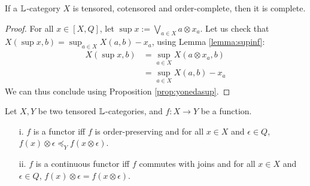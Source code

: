 \begin{proposition}\label{prop:tencoten}
If a $\mathbb{L}$-category $X$ is tensored, cotensored and order-complete, then it is complete.
\end{proposition}
\begin{proof}
For all $x\in [X,Q]$, let $\sup x:= \bigvee_{a\in X}a\otimes x_{a}$. 
Let us check that $X(\sup x, b)= \sup_{a\in X}X(a,b)-x_{a}$, using Lemma \ref{lemma:supinf}:
\begin{align*}
X(\sup x, b) &= \sup_{a\in X}X(a\otimes x_{a},b)\\
&=\sup_{a\in X}X(a,b)-x_{a}
\end{align*}
We can thus conclude using Proposition \ref{prop:yonedasup}.
\end{proof}

\begin{proposition}\label{prop:tenfun}
Let $X,Y$ be two tensored $\mathbb{L}$-categories, and $f:X\to Y$ be a function.
\begin{itemize}
\item[i.] $f$ is a functor iff $f$ is order-preserving and for all $x\in X$ and $\epsilon\in Q$, $f(x)\otimes \epsilon \preceq_{Y} f(x\otimes \epsilon)$.

\item[ii.] $f$ is a continuous functor iff $f$ commutes with joins and for all $x\in X$ and $\epsilon\in Q$, $f(x)\otimes \epsilon = f(x\otimes \epsilon)$.
\end{itemize}
\end{proposition}
